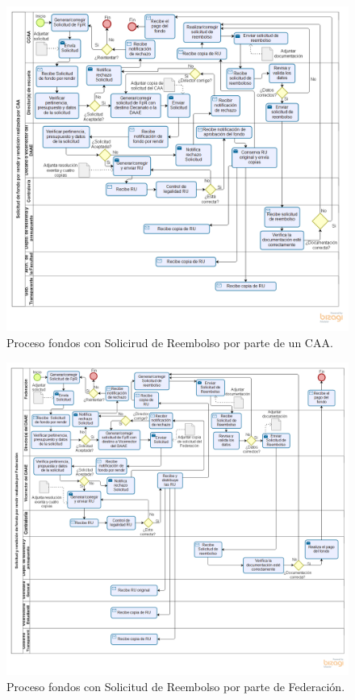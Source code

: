 \begin{figure}[tb!]
    \hspace{-9mm}
    \includegraphics[width=1.1\textwidth]{Imagenes/Solicitud_CCAA_Reembolso.png}
    \caption{\label{fig: Solicitud_CAA_Reembolso}Proceso fondos con Solicirud de Reembolso por parte de un CAA.}
\end{figure}

\begin{figure}[tb!]
    \hspace{-9mm}
    \includegraphics[width=1.1\textwidth]{Imagenes/Solicitud_Federacion_Reembolso.png}
    \caption{\label{fig: Solicitud_Federacion_Reembolso}Proceso fondos con Solicitud de Reembolso por parte de Federación.}
\end{figure}

